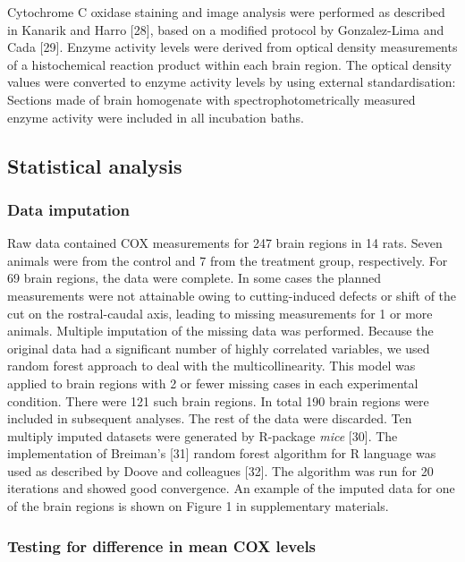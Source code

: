 \documentclass[man]{apa6}
\begin{document}
Cytochrome C oxidase staining and image analysis were performed as described in Kanarik and Harro {[}28{]}, based on a modified protocol by Gonzalez-Lima and Cada {[}29{]}. Enzyme activity levels were derived from optical density measurements of a histochemical reaction product within each brain region. The optical density values were converted to enzyme activity levels by using external standardisation: Sections made of brain homogenate with spectrophotometrically measured enzyme activity were included in all incubation baths.

\hypertarget{statistical-analysis}{%
\subsection{Statistical analysis}\label{statistical-analysis}}

\hypertarget{data-imputation}{%
\subsubsection{Data imputation}\label{data-imputation}}

Raw data contained COX measurements for 247 brain regions in 14 rats. Seven animals were from the control and 7 from the treatment group, respectively. For 69 brain regions, the data were complete. In some cases the planned measurements were not attainable owing to cutting-induced defects or shift of the cut on the rostral-caudal axis, leading to missing measurements for 1 or more animals. Multiple imputation of the missing data was performed. Because the original data had a significant number of highly correlated variables, we used random forest approach to deal with the multicollinearity. This model was applied to brain regions with 2 or fewer missing cases in each experimental condition. There were 121 such brain regions. In total 190 brain regions were included in subsequent analyses. The rest of the data were discarded. Ten multiply imputed datasets were generated by R-package \emph{mice} {[}30{]}. The implementation of Breiman's {[}31{]} random forest algorithm for R language was used as described by Doove and colleagues {[}32{]}. The algorithm was run for 20 iterations and showed good convergence. An example of the imputed data for one of the brain regions is shown on Figure 1 in supplementary materials.

\hypertarget{testing-for-difference-in-mean-cox-levels}{%
\subsubsection{Testing for difference in mean COX levels}\label{testing-for-difference-in-mean-cox-levels}}
\end{document}
